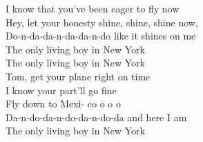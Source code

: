  I know that you've been eager to  fly now\\
 Hey, let your honesty  shine, shine,  shine now,\\
 Do-n-da-da-n-da-da-n-do like it  shines on me\\
The  only living boy in New  York\\
The  only living boy in New  York\\
 Tom, get your plane right on  time\\
 I know your part'll go  fine\\
 Fly down to Mexi- co o o  o\\
 Da-n-do-da-n-do-da-n-do-da and  here I am\\
The  only living boy in New  York\\
